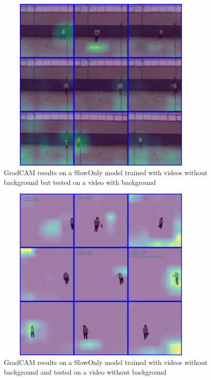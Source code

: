 \documentclass[extern,palatino]{cgMA}
\begin{document}
\begin{figure}[h]
\center
\includegraphics[height={250pt}, width={300pt}]{Thesis/images/gradcam_no_background.jpg}
\caption{GradCAM results on a SlowOnly model trained with videos without background but tested on a video with background}
\label{fig:gradcam_no_background_model}
\end{figure}

\begin{figure}[h]
\center
\includegraphics[height={250pt}, width={300pt}]{Thesis/images/gradcam_white_background.jpg}
\caption{GradCAM results on a SlowOnly model trained with videos without background and tested on a video without background}
\label{fig:gradcam_white_background_video}
\end{figure}
\end{document}
